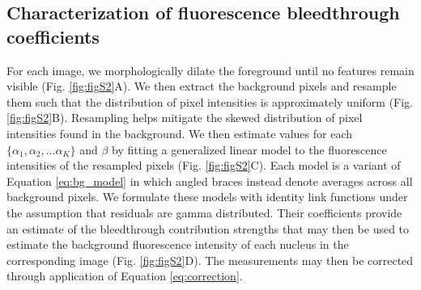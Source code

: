 \subsection{Characterization of fluorescence bleedthrough coefficients}

For each image, we morphologically dilate the foreground until no features remain visible (Fig. \ref{fig:figS2}A). We then extract the background pixels and resample them such that the distribution of pixel intensities is approximately uniform (Fig. \ref{fig:figS2}B). Resampling helps mitigate the skewed distribution of pixel intensities found in the background. We then estimate values for each $\{\alpha_1, \alpha_2, \ldots \alpha_K\}$ and $\beta$ by fitting a generalized linear model to the fluorescence intensities of the resampled pixels (Fig. \ref{fig:figS2}C). Each model is a variant of Equation \ref{eq:bg_model} in which angled braces instead denote averages across all background pixels. We formulate these models with identity link functions under the assumption that residuals are gamma distributed. Their coefficients provide an estimate of the bleedthrough contribution strengths that may then be used to estimate the background fluorescence intensity of each nucleus in the corresponding image (Fig. \ref{fig:figS2}D). The measurements may then be corrected through application of Equation \ref{eq:correction}. 



